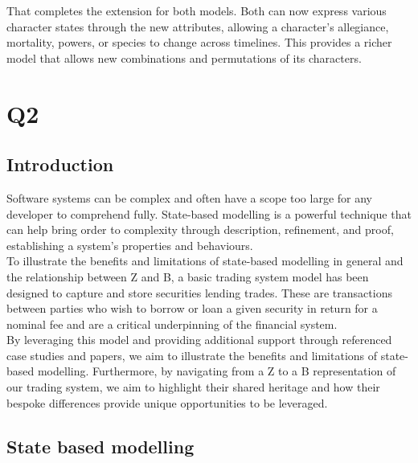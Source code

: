 \documentclass{article}
\begin{document}
\hspace{-0.7cm} That completes the extension for both models. Both can now express various character states through the new attributes, allowing a character’s allegiance, mortality, powers, or species to change across timelines. This provides a richer model that allows new combinations and permutations of its characters.

\pagebreak
\section*{Q2}

\subsection*{Introduction}

Software systems can be complex and often have a scope too large for any developer to comprehend fully. State-based modelling is a powerful technique that can help bring order to complexity through description, refinement, and proof, establishing a system's properties and behaviours. \\
\newline
To illustrate the benefits and limitations of state-based modelling in general and the relationship between Z and B, a basic trading system model has been designed to capture and store securities lending trades. These are transactions between parties who wish to borrow or loan a given security in return for a nominal fee and are a critical underpinning of the financial system. \\
\newline
By leveraging this model and providing additional support through referenced case studies and papers, we aim to illustrate the benefits and limitations of state-based modelling. Furthermore, by navigating from a Z to a B representation of our trading system, we aim to highlight their shared heritage and how their bespoke differences provide unique opportunities to be leveraged. 

\subsection*{State based modelling}
\end{document}

